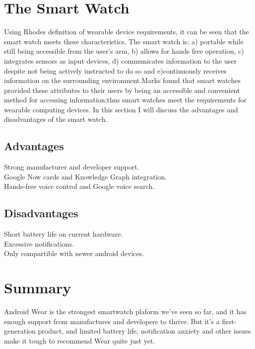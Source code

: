 \documentclass{article}
\begin{document}
\section{The Smart Watch}
Using Rhodes definition\cite{r4} of wearable device requirements, it can be seen that the smart
watch meets these characteristics. The smart watch is: a) portable while still being accessible from the user's arm, b) allows for hands free operation, c) integrates sensors as input devices, d) communicates information to the user despite not being actively instructed to do so and e)continuously receives information on the surrounding environment.Marks\cite{r1} found that smart watches provided these attributes to their users by being an accessible and convenient method for accessing information;thus smart watches meet the requirements for wearable computing devices. In this section I will discuss the advantages and disadvantages of the smart watch.
\subsection{Advantages}\cite{r5}
Strong manufacturer and developer support.\\
Google Now cards and Knowledge Graph integration.\\
Hands-free voice control and Google voice search. 
\subsection{Disadvantages}\cite{r5}
Short battery life on current hardware.\\
Excessive notifications.\\
Only compartible with newer android devices.
\section{Summary}
Android Wear is the strongest smartwatch plaform we've seen so far, and it has enough support from manufactures and developers to thrive. But it's a first-generation product, and limited battery life, notification anxiety and other issues make it tough to recommend Wear quite just yet.


\end{document}
